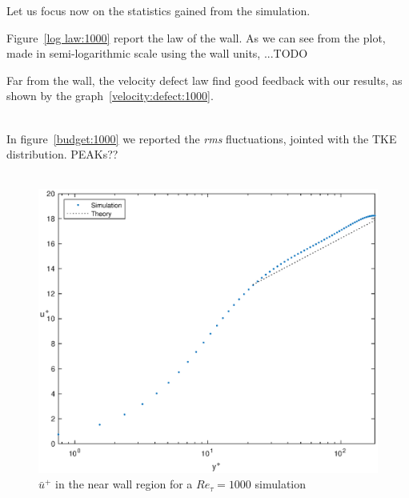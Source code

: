 Let us focus now on the statistics gained from the simulation.\par
Figure~\ref{log law:1000} report the law of the wall. As we can see from the plot, made in semi-logarithmic scale using the wall units, ...TODO \par
Far from the wall, the velocity defect law find good feedback with our results, as shown by the graph~\ref{velocity:defect:1000}.\\~\par


In figure~\ref{budget:1000} we reported the \emph{rms} fluctuations, jointed with the TKE distribution. PEAKs?? \\~\par

\begin{figure}
\begin{center}
\includegraphics[scale=0.55]{grafici/loglaw_1000.eps}
\caption{$\bar{u}^{+}$ in the near wall region for a $Re_{\tau}=1000$ simulation}
\label{loglaw:1000}
\end{center} 
\end{figure}

